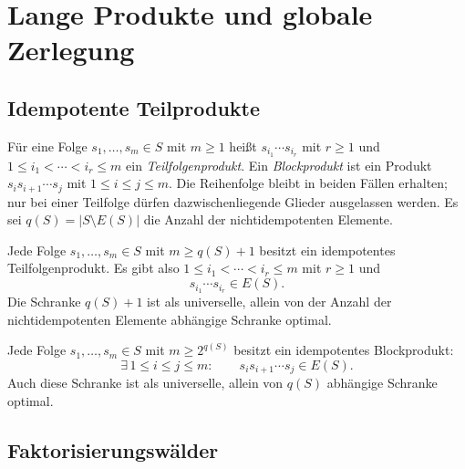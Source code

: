 \chapter{Lange Produkte und globale Zerlegung}
\label{chap:b37-guide-global}

\section{Idempotente Teilprodukte}

\begin{definition}
Für eine Folge $s_1,\ldots,s_m\in S$ mit $m\geq1$ heißt
$s_{i_1}\cdots s_{i_r}$ mit $r\geq1$ und
$1\leq i_1<\cdots<i_r\leq m$ ein \emph{Teilfolgenprodukt}.
Ein \emph{Blockprodukt} ist ein Produkt $s_i s_{i+1}\cdots s_j$
mit $1\leq i\leq j\leq m$.
Die Reihenfolge bleibt in beiden Fällen erhalten; nur bei einer
Teilfolge dürfen dazwischenliegende Glieder ausgelassen werden.
Es sei $q(S)=|S\setminus E(S)|$ die Anzahl der nichtidempotenten Elemente.
\end{definition}

\begin{theorem}
\label{guide:idempotent-subsequence}
Jede Folge $s_1,\ldots,s_m\in S$ mit $m\geq q(S)+1$ besitzt ein
idempotentes Teilfolgenprodukt. Es gibt also
$1\leq i_1<\cdots<i_r\leq m$ mit $r\geq1$ und
\[
 s_{i_1}\cdots s_{i_r}\in E(S).
\]
Die Schranke $q(S)+1$ ist als universelle, allein von der Anzahl der
nichtidempotenten Elemente abhängige Schranke optimal.
\cite{gillam1972,wang2016}
\end{theorem}


\begin{theorem}
\label{guide:idempotent-block}
Jede Folge $s_1,\ldots,s_m\in S$ mit $m\geq 2^{q(S)}$ besitzt ein
idempotentes Blockprodukt:
\[
 \exists\,1\leq i\leq j\leq m:\qquad
 s_i s_{i+1}\cdots s_j\in E(S).
\]
Auch diese Schranke ist als universelle, allein von $q(S)$ abhängige
Schranke optimal. \cite{hallsapir1996}
\end{theorem}

\section{Faktorisierungswälder}

